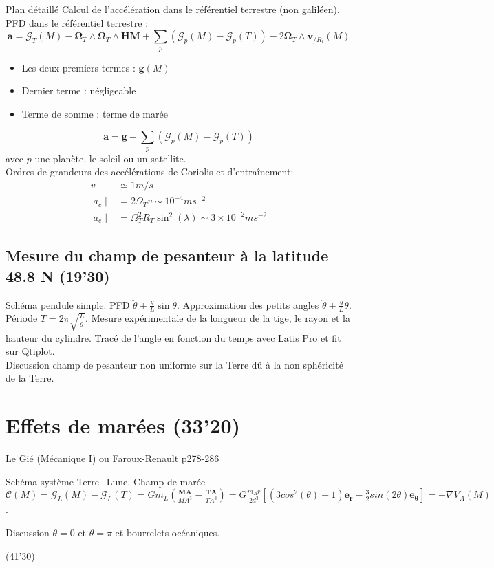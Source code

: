 \begin{reportBlock}{Plan détaillé}
Calcul de l'accélération dans le référentiel terrestre (non galiléen). PFD dans le référentiel terrestre :
\begin{equation}
    \mathbf a = \mathbf{\mathcal{G}}_T(M) - \mathbf \Omega_T \land \mathbf \Omega_T \land \mathbf{HM} + \sum_p \left(\mathbf{\mathcal{G}}_p(M) - \mathbf{\mathcal{G}}_p(T) \right) - 2  \mathbf \Omega_T \land \mathbf v_{/R_t}(M)
\end{equation}
\begin{itemize}
    \item Les deux premiers termes : $\mathbf g(M)$ 
    \item Dernier terme : négligeable
    \item Terme de somme : terme de marée
\end{itemize}
\begin{equation}
    \mathbf{a} = \mathbf{g} + \sum_{p} \left( \mathbf{\mathcal{G}}_p(M) - \mathbf{\mathcal{G}}_p(T) \right)
\end{equation}
avec $p$ une planète, le soleil ou un satellite.\\

Ordres de grandeurs des accélérations de Coriolis et d'entraînement:
\begin{align}
v & \simeq  1m/s \\
\mid a_c \mid & = 2 \Omega_T v \sim 10^{-4} m s^{-2}   \\
\mid a_e \mid & = \Omega_T^2 R_T \sin^2(\lambda) \sim 3\times10^{-2} m s^{-2}
\end{align}

\subsection{Mesure du champ de pesanteur à la latitude 48.8 N (19'30)}

Schéma pendule simple. PFD $\ddot{\theta} + \frac{g}{L} \sin \theta$. Approximation des petits angles $\ddot{\theta} + \frac{g}{L} \theta$. Période $T = 2\pi\sqrt{\frac{L}{g}}$. Mesure expérimentale de la longueur de la tige, le rayon et la hauteur du cylindre. Tracé de l'angle en fonction du temps avec Latis Pro et fit sur Qtiplot.\\

Discussion champ de pesanteur non uniforme sur la Terre dû à la non sphéricité de la Terre.

\section{Effets de marées (33'20)}
Le Gié (Mécanique I) ou Faroux-Renault p278-286

Schéma système Terre+Lune. Champ de marée $\mathbf{\mathcal{C}}(M) = \mathbf{\mathcal{G}}_L(M) - \mathbf{\mathcal{G}}_L(T) =  G m_L \left( \frac{\mathbf{MA}}{MA^3} - \frac{\mathbf{TA}}{TA^3} \right) = G \frac{m_A r}{2d^3} \left[(3cos^2(\theta) - 1) \mathbf{e_r} - \frac{3}{2} sin(2\theta) \mathbf{e_\theta} \right] = - \nabla V_A(M)$.


Discussion $\theta = 0$ et $\theta = \pi$ et bourrelets océaniques.

(41'30)

\end{reportBlock}


